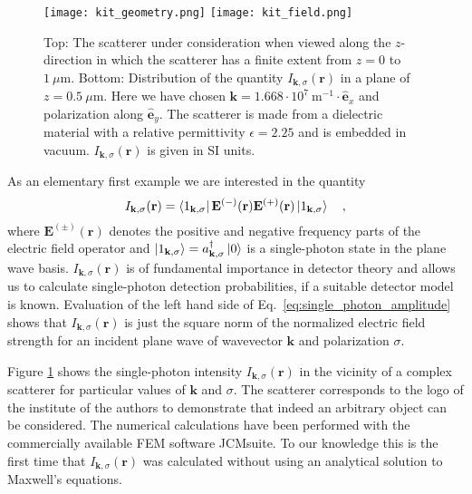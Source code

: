 \documentclass[10pt,letterpaper]{article}
\renewcommand{\vec}[1]{\mathbf{#1}}
\let\oldhat\hat
\renewcommand{\hat}[1]{\oldhat{\vec{#1}}}
\begin{document}
\begin{figure}
\begin{center}
\texttt{[image: kit\_geometry.png]}
\texttt{[image: kit\_field.png]}
\end{center}
\caption{Top: The scatterer under consideration when viewed along the $z$-direction in which the scatterer has a finite extent from $z = 0$ to  $1~\mu\text{m}$. Bottom: Distribution of the quantity $I_{\vec{k},\sigma}(\vec{r})$ in a plane of $z=0.5~\mu\text{m}$. Here we have chosen $\vec{k} = 1.668\cdot10^7~\text{m}^{-1}\cdot\hat{e}_x$ and polarization along $\hat{e}_y$. The scatterer is made from a dielectric material with a relative permittivity $\epsilon = 2.25$ and is embedded in vacuum. $I_{\vec{k},\sigma}(\vec{r})$ is given in SI units. \label{fig:kit_scattering}}
\end{figure}
As an elementary first example we are interested in the quantity
\begin{equation}
I_{\vec{k},\sigma}(\vec{r}) = \bra{1_{\vec{k},\sigma}}\vec{E}^{(-)}(\vec{r})\vec{E}^{(+)}(\vec{r})\ket{1_{\vec{k},\sigma}} \quad , \label{eq:single_photon_amplitude}
\end{equation}
where $\vec{E}^{(\pm)}(\vec{r})$ denotes the positive and negative frequency parts of the electric field operator \cite{Vogel1994} and $\ket{1_{\vec{k},\sigma}}=a^\dagger_{\vec{k},\sigma}\ket{0}$ is a single-photon state in the plane wave basis. $I_{\vec{k},\sigma}(\vec{r})$ is of fundamental importance in detector theory \cite{Vogel1994} and allows us to calculate single-photon detection probabilities, if a suitable detector model is known. Evaluation of the left hand side of Eq.~\eqref{eq:single_photon_amplitude} shows that $I_{\vec{k},\sigma}(\vec{r})$ is just the square norm of the normalized electric field strength for an incident plane wave of wavevector $\vec{k}$ and polarization $\sigma$.

Figure \ref{fig:kit_scattering} shows the single-photon intensity $I_{\vec{k},\sigma}(\vec{r})$ in the vicinity of a complex scatterer for particular values of $\vec{k}$ and $\sigma$. The scatterer corresponds to the logo of the institute of the authors to demonstrate that indeed an arbitrary object can be considered. The numerical calculations have been performed with the commercially available FEM software JCMsuite. To our knowledge this is the first time that $I_{\vec{k},\sigma}(\vec{r})$ was calculated without using an analytical solution to Maxwell's equations.
\end{document}
